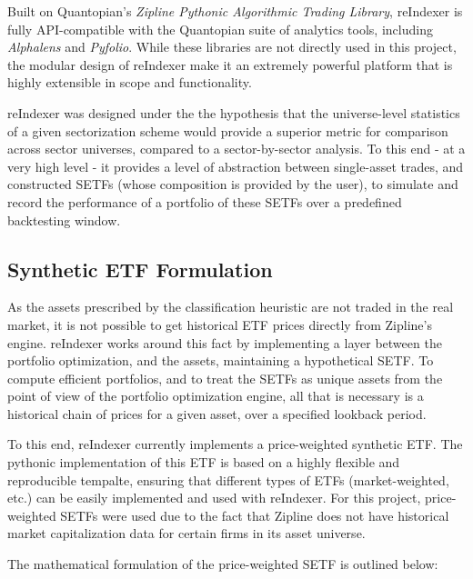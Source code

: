 \documentclass[../main.tex]{subfiles}
\begin{document}
Built on Quantopian's \textit{Zipline Pythonic Algorithmic Trading Library}, reIndexer is fully API-compatible with the Quantopian suite of analytics tools, including \textit{Alphalens} and \textit{Pyfolio}. While these libraries are not directly used in this project, the modular design of reIndexer make it an extremely powerful platform that is highly extensible in scope and functionality.

reIndexer was designed under the the hypothesis that the universe-level statistics of a given sectorization scheme would provide a superior metric for comparison across sector universes, compared to a sector-by-sector analysis. To this end - at a very high level - it provides a level of abstraction between single-asset trades, and constructed SETFs (whose composition is provided by the user), to simulate and record the performance of a portfolio of these SETFs over a predefined backtesting window.

\subsection{Synthetic ETF Formulation}

As the assets prescribed by the classification heuristic are not traded in the real market, it is not possible to get historical ETF prices directly from Zipline's engine. reIndexer works around this fact by implementing a layer between the portfolio optimization, and the assets, maintaining a hypothetical SETF. To compute efficient portfolios, and to treat the SETFs as unique assets from the point of view of the portfolio optimization engine, all that is necessary is a historical chain of prices for a given asset, over a specified lookback period.

To this end, reIndexer currently implements a price-weighted synthetic ETF. The pythonic implementation of this ETF is based on a highly flexible and reproducible tempalte, ensuring that different types of ETFs (market-weighted, etc.) can be easily implemented and used with reIndexer. For this project, price-weighted SETFs were used due to the fact that Zipline does not have historical market capitalization data for certain firms in its asset universe.

The mathematical formulation of the price-weighted SETF is outlined below:

\pagebreak
\end{document}
